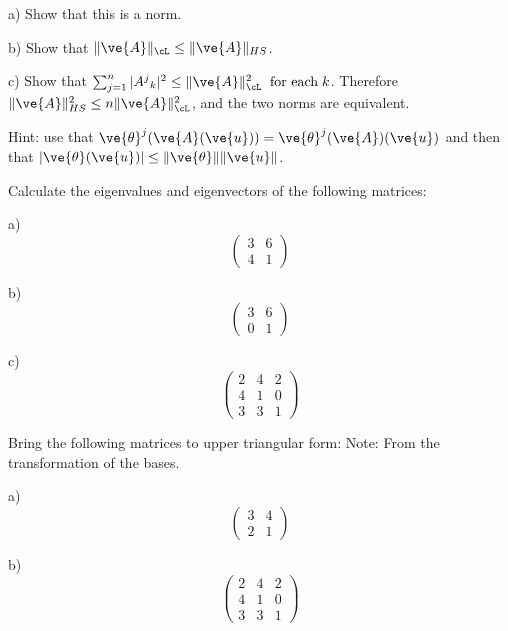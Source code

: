 {a) Show that this is a norm.

b) Show that $\|\ve{A}\|_{\cL} \leq \|\ve{A}\|_{HS}$.

c) Show that $\sum_{j=1}^n |A^j{}_k|^2 \leq \|\ve{A}\|_{\cL}^2\;\;\mbox{for each}\; k$. Therefore {\small $\|\ve{A}\|_{HS}^2 \leq n \|\ve{A}\|_{\cL}^2$}, and the two norms
are equivalent.

\noi Hint: use that 
$\ve{\theta}^j(\ve{A}(\ve{u})) = \ve{\theta}^j(\ve{A})(\ve{u})$ 
and then that
$|\ve{\theta}(\ve{u})| \leq \|\ve{\theta}\| \|\ve{u}\|$.
\epro

\bpro
Calculate the eigenvalues and eigenvectors of the following matrices:

a)
\begin{equation}
  \left(
    \begin{array}{cc}
      3 & 6  \\
      4 & 1 
    \end{array}
  \right)
\end{equation}

b)
\begin{equation}
  \left(
    \begin{array}{cc}
      3 & 6  \\
      0 & 1 
    \end{array}
  \right)
\end{equation}

c)
\begin{equation}
  \left(
    \begin{array}{ccc}
      2 & 4 & 2 \\
      4 & 1 & 0 \\
      3 & 3 & 1
    \end{array}
  \right)
\end{equation}
\epro

\bpro
Bring the following matrices to upper triangular form:
Note: From the transformation of the bases.

a)
\begin{equation}
  \left(
    \begin{array}{cc}
      3 & 4  \\
      2 & 1 
    \end{array}
  \right)
\end{equation}

b)
\begin{equation}
  \left(
    \begin{array}{ccc}
      2 & 4 & 2 \\
      4 & 1 & 0 \\
      3 & 3 & 1
    \end{array}
  \right)
\end{equation}

}
